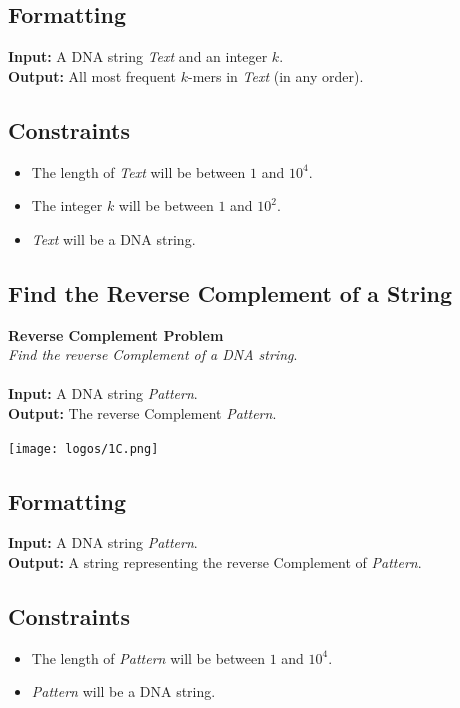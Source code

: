\documentclass{article}
\begin{document}
\subsection*{Formatting}
\textbf{Input:} A DNA string \emph{Text} and an integer $k$.\\
\noindent \textbf{Output:} All most frequent $k$-mers in \emph{Text} (in any order).

\subsection*{Constraints}
\begin{itemize}
    \item The length of \emph{Text} will be between $1$ and $10^4$.
    \item The integer $k$ will be between $1$ and $10^2$.
    \item \emph{Text} will be a DNA string.
\end{itemize}
\pagebreak
\subsection{Find the Reverse Complement of a String}
\hline\vspace{5}
\noindent \textbf{Reverse Complement Problem}\\
\emph{Find the reverse Complement of a DNA string}.\\ \\
\textbf{Input:} A DNA string \emph{Pattern}.\\
\textbf{Output:} The reverse Complement \emph{Pattern}.
\begin{center}
    \texttt{[image: logos/1C.png]} 
\end{center}
\hline\vspace{5}

\subsection*{Formatting}
\textbf{Input:} A DNA string \emph{Pattern}.\\
\noindent \textbf{Output:} A string representing the reverse Complement of \emph{Pattern}.

\subsection*{Constraints}
\begin{itemize}
    \item The length of \emph{Pattern} will be between $1$ and $10^4$.
    \item \emph{Pattern} will be a DNA string.
\end{itemize}
\pagebreak
\end{document}

